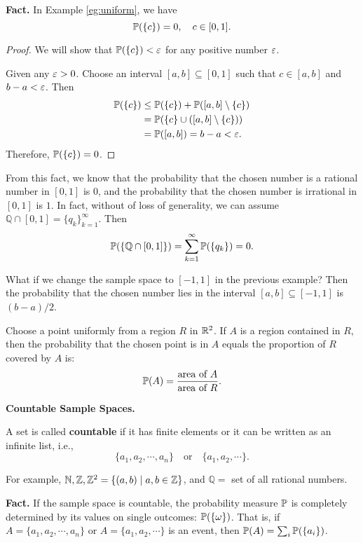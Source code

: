     \textbf{Fact.} In Example \ref{eg:uniform}, we have
    \[
      \mathbb{P}(\{c\}) = 0,\quad c\in [0,1].
    \]
    \begin{proof}
      We will show that $\mathbb{P}(\{c\})<\varepsilon$ for any positive number $\varepsilon$.

      Given any $\varepsilon>0$. Choose an interval $[a,b]\subseteq [0,1]$ such that
      $c\in [a,b]$ and $b-a<\varepsilon$. Then
      \begin{align*}
        \mathbb{P}(\{c\})
        & \le \mathbb{P}(\{c\}) + \mathbb{P}([a,b]\setminus \{c\}) \\
        & = \mathbb{P}(\{c\} \cup ([a,b]\setminus \{c\}))\\
        & = \mathbb{P}([a,b]) = b-a<\varepsilon.
      \end{align*}
      Therefore, $\mathbb{P}(\{c\}) = 0$.
    \end{proof}
    From this fact, we know that the probability that the chosen number is a
    rational number in $[0,1]$ is $0$, and the probability that the chosen
    number is irrational in $[0,1]$ is $1$. In fact, without of loss of
    generality, we can assume $\mathbb{Q}\cap [0,1]= \{q_k\}_{k=1}^\infty$. Then
    \[
      \mathbb{P}(\{\mathbb{Q}\cap [0,1]\}) = \sum_{k=1}^\infty\mathbb{P}(\{q_k\})=0.
    \]
 
    \begin{example}
   What if we change the sample space to $[-1,1]$ in the previous example? Then
   the probability that the chosen number lies in the interval $[a,b]\subseteq
   [-1,1]$ is $(b-a)/2$.
 \end{example}
 \begin{example}
   Choose a point uniformly from a region $R$ in $\mathbb{R}^2$. If $A$ is a region
   contained in $R$, then the probability that the chosen point is in $A$ equals
   the proportion of $R$ covered by $A$ is:
   \[
     \mathbb{P}(A) = \frac{\text{area of}~A}{\text{area of}~R}.
   \]
 \end{example}

 \textbf{Countable Sample Spaces.}
 \begin{definition}
   A set is called \textbf{countable} if it has finite elements or it can be
   written as an infinite list, i.e.,
   \[
     \{a_1,a_2,\cdots, a_n\}\quad\text{or}\quad\{a_1,a_2,\cdots\}.
   \]
 \end{definition}
 For example, $\mathbb{N}, \mathbb{Z}, \mathbb{Z}^2 = \{(a,b)\mid a, b\in \mathbb{Z}\}$, and $\mathbb{Q}=$ set
 of all rational numbers.

 \textbf{Fact.} If the sample space is countable, the probability measure $\mathbb{P}$
 is completely determined by its values on single outcomes: $\mathbb{P}(\{\omega\})$.
 That is, if $A=\{a_1,a_2,\cdots, a_n\}$ or $A=\{a_1,a_2,\cdots\}$ is an event,
 then $\mathbb{P}(A) = \sum_i \mathbb{P}(\{a_i\})$.

